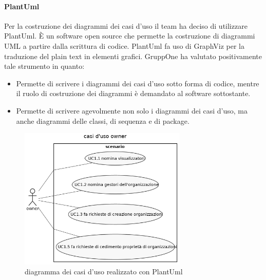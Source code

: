 \documentclass[../norme-di-progetto.tex]{subfiles}
\begin{document}
\paragraph{PlantUml}%
\label{par:plantuml}
Per la costruzione dei diagrammi dei casi d'uso il team ha deciso di utilizzare PlantUml. È un software open source che permette la costruzione di diagrammi UML a partire dalla scrittura di codice. PlantUml fa uso di GraphViz per la traduzione del plain text in elementi grafici. GruppOne ha valutato positivamente tale strumento in quanto:

\begin{itemize}
  \item Permette di scrivere i diagrammi dei casi d'uso sotto forma di codice, mentre il ruolo di costruzione dei diagrammi è demandato al software sottostante.
  \item Permette di scrivere agevolmente non solo i diagrammi dei casi d'uso, ma anche diagrammi delle classi, di sequenza e di package.
\end{itemize}

\begin{figure}[H]
  \includegraphics[width=8cm]{components/img/owner_use_cases.png}
  \centering
  \caption{diagramma dei casi d'uso realizzato con PlantUml}
\end{figure}
\end{document}
